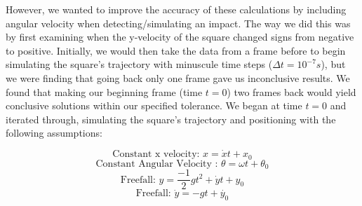 \documentclass{article}
\begin{document}
\noindent However, we wanted to improve the accuracy of these calculations by including angular velocity when detecting/simulating an impact. The way we did this was by first examining when the y-velocity of the square changed signs from negative to positive. Initially, we would then take the data from a frame before to begin simulating the square's trajectory with minuscule time steps ($\Delta t = 10^{-7}  s$), but we were finding that going back only one frame gave us inconclusive results. We found that making our beginning frame (time $t = 0$) two frames back would yield conclusive solutions within our specified tolerance. We began at time $t = 0$ and iterated through, simulating the square's trajectory and positioning with the following assumptions: 

    
  
\begin{equation}
    \mbox{Constant x velocity: } x = \dot{x} t + x_0  
\end{equation}
\begin{equation}
    \mbox{Constant Angular Velocity : } \theta = \omega t + \theta_0
\end{equation}
\begin{equation}
     \mbox{Freefall: }y = \frac{-1}{2} gt^{2} + \dot{y} t + y_0 
\end{equation}
\begin{equation}
    \mbox{Freefall: }\dot{y} = -gt + \dot{y_0} 
\end{equation}
\end{document}
